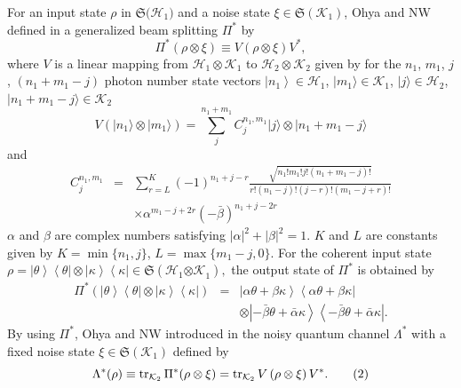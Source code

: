 For an input state  $  \rho  $   in  $  \mathfrak{S(}\mathcal{H}_{1}\mathcal{)} $   and
a noise state  $  \xi \in \mathfrak{S}\left( \mathcal{K}_{1}\right)  $,   Ohya and
NW defined in \cite{nv:-OW3} a generalized beam splitting  $  \Pi ^{\ast } $   by 
\[
\Pi ^{\ast }(\rho \otimes \xi )\equiv V\left( \rho \otimes \xi \right)
V^{\ast }, 
\]%
where  $  V $   is a linear mapping from  $  \mathcal{H}_{1}\otimes \mathcal{K}_{1} $  
to  $  \mathcal{H}_{2}\otimes \mathcal{K}_{2} $   given by for the  $  n_{1} $,    $  m_{1} $,    $  j $,    $  \left( n_{1}+m_{1}-j\right)  $   photon number state vectors  $  \left\vert n_{1}\right\rangle \in \mathcal{H}_{1} $,    $  |m_{1}\rangle \in \mathcal{
K}_{1} $,    $  |j\rangle \in \mathcal{H}_{2} $,    $  |n_{1}+m_{1}-j\rangle \in \mathcal{K}_{2} $   
\[
V(|n_{1}\rangle \otimes |m_{1}\rangle
)=\sum_{j}^{n_{1}+m_{1}}C_{j}^{n_{1},m_{1}}|j\rangle \otimes
|n_{1}+m_{1}-j\rangle 
\]%
and 
\begin{equation}
\tag{1}
\begin{array}{rcl}
\displaystyle
C_{j}^{n_{1},m_{1}} 
&=&\displaystyle\sum_{r=L}^{K}(-1)^{n_{1}+j-r}{\frac{\sqrt{n_{1}!m_{1}!j!(n_{1}+m_{1}-j)!}%
}{{r!(n_{1}-j)!(j-r)!(m_{1}-j+r)!}}}  \\
&&\times \alpha ^{m_{1}-j+2r}\left(-\bar{\beta}\right) ^{n_{1}+j-2r} 
\end{array}
\end{equation}
 $  \alpha  $   and  $  \beta  $   are complex numbers satisfying  $  \left\vert \alpha
\right\vert ^{2}+\left\vert \beta \right\vert ^{2}=1 $.  $  K $   and  $  L $   are
constants given by  $  K=\min \{n_{1},j\} $,    $  L=\max \{m_{1}-j, 0\} $. For the
coherent input state  $  \rho =\left\vert \theta \right\rangle \left\langle
\theta \right\vert \otimes \left\vert \kappa \right\rangle \left\langle
\kappa \right\vert \in \mathfrak{S}\left( \mathcal{H}_{1}{\otimes \mathcal{K}%
}_{1}\right),  $   the output state of  $  \Pi ^{\ast } $   is obtained by 
\begin{eqnarray*}
\Pi ^{\ast }\left( \left\vert \theta \right\rangle \left\langle \theta
\right\vert \otimes \left\vert \kappa \right\rangle \left\langle \kappa
\right\vert \right) &=&\left\vert \alpha \theta +\beta \kappa \right\rangle
\left\langle \alpha \theta +\beta \kappa \right\vert \\
&&\otimes \left\vert-\bar{\beta}\theta +\bar{\alpha}\kappa \right\rangle
\left\langle-\bar{\beta}\theta +\bar{\alpha}\kappa \right\vert.
\end{eqnarray*}%
By using  $  \Pi ^{\ast } $,   Ohya and NW introduced in \cite{nv:-OW3} the noisy
quantum channel  $  \Lambda ^{\ast } $   with a fixed noise state  $  \xi \in 
\mathfrak{S}\left( \mathcal{K}_{1}\right)  $   defined by 
\begin{equation}
\Lambda ^{\ast }(\rho )\equiv \mathop{\rm tr}\nolimits_{\mathcal{K}_{2}}\Pi ^{\ast }(\rho \otimes
\xi )=\mathop{\rm tr}\nolimits_{\mathcal{K}_{2}}V\left( \rho \otimes \xi \right) V^{\ast }.
\tag{2}
\end{equation}

